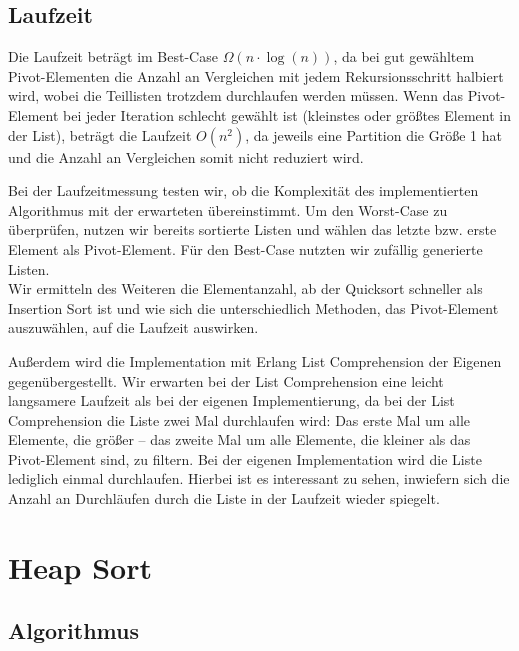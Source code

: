 \documentclass[11pt]{article}
\begin{document}
    \subsection{Laufzeit}\label{subsec:Qlaufzeit}

    Die Laufzeit beträgt im Best-Case \(\Omega (n \cdot \log(n))\), da bei
    gut gewähltem Pivot-Elementen die Anzahl an Vergleichen mit jedem
    Rekursionsschritt halbiert wird, wobei die Teillisten trotzdem durchlaufen
    werden müssen.
    Wenn das Pivot-Element bei jeder Iteration schlecht gewählt ist (kleinstes
    oder größtes Element in der List), beträgt die Laufzeit \(O(n^2)\), da
    jeweils eine Partition die Größe 1 hat und die Anzahl an Vergleichen
    somit nicht reduziert wird.

    Bei der Laufzeitmessung testen wir, ob die Komplexität des implementierten
    Algorithmus mit der erwarteten übereinstimmt.
    Um den Worst-Case zu überprüfen, nutzen wir bereits sortierte Listen und
    wählen das letzte bzw. erste Element als Pivot-Element.
    Für den Best-Case nutzten wir zufällig generierte Listen.\\

    Wir ermitteln des Weiteren die Elementanzahl, ab der Quicksort schneller
    als Insertion Sort ist und wie sich die unterschiedlich Methoden, das
    Pivot-Element auszuwählen, auf die Laufzeit auswirken.

    Außerdem wird die Implementation mit Erlang List Comprehension der
    Eigenen gegenübergestellt.
    Wir erwarten bei der List Comprehension eine leicht langsamere Laufzeit als
    bei der eigenen Implementierung, da bei der List Comprehension die Liste
    zwei Mal durchlaufen wird:
    Das erste Mal um alle Elemente, die größer -- das zweite Mal
    um alle Elemente, die kleiner als das Pivot-Element sind, zu filtern.
    Bei der eigenen Implementation wird die Liste lediglich einmal
    durchlaufen.
    Hierbei ist es interessant zu sehen, inwiefern sich die Anzahl an
    Durchläufen durch die Liste in der Laufzeit wieder spiegelt.


    \section{Heap Sort}\label{sec:heap-sort}

    \subsection{Algorithmus}\label{subsec:Halgorithmus}
\end{document}

